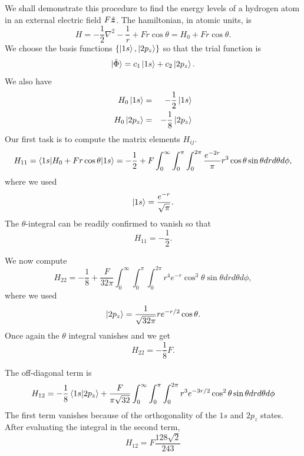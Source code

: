 We shall demonstrate this procedure to find the energy levels of a hydrogen
atom in an external electric field $F\hat{\bm{z}}$. The hamiltonian, in atomic units,
is
\begin{equation}\label{c1e21}
H = -\frac{1}{2}\nabla^2 - \frac{1}{r} + Fr\cos\theta = H_0 +
Fr\cos\theta.
\end{equation}
We choose the basis functions $\{\ket{1s}, \ket{2p_z}\}$ so that the trial
function is
\begin{equation}\label{c1e22}
\ket{\tilde{\Phi}} = c_1\ket{1s} + c_2\ket{2p_z}.
\end{equation}
We also have
\begin{eqnarray*}
H_0\ket{1s} &=& -\frac{1}{2}\ket{1s} \\
H_0\ket{2p_z} &=& -\frac{1}{8}\ket{2p_z}
\end{eqnarray*}
Our first task is to compute the matrix elements $H_{ij}$.
\begin{equation}\label{c1e23}
H_{11} = \braket{1s|H_0 + Fr\cos\theta|1s} = -\frac{1}{2} + F\int_0^\infty
\int_0^\pi\int_0^{2\pi} \frac{e^{-2r}}{\pi}r^3\cos\theta\sin\theta drd\theta
d\phi,
\end{equation}
where we used
\[
\ket{1s} = \frac{e^{-r}}{\sqrt{\pi}}.
\]
The $\theta$-integral can be readily confirmed to vanish so that
\begin{equation}\label{c1e24}
H_{11} = -\frac{1}{2}.
\end{equation}

We now compute
\begin{equation}\label{c1e25}
H_{22} = -\frac{1}{8} + \frac{F}{32\pi}\int_0^\infty\int_0^\pi\int_0^{2\pi}
r^4e^{-r}\cos^3\theta\sin\theta drd\theta d\phi,
\end{equation}
where we used
\begin{equation*}
\ket{2p_z} = \frac{1}{\sqrt{32\pi}} re^{-r/2}\cos\theta.
\end{equation*}
Once again the $\theta$ integral vanishes and we get
\begin{equation}\label{c1e26}
H_{22} = -\frac{1}{8}F.
\end{equation}

The off-diagonal term is
\begin{equation}\label{c1e27}
H_{12} = -\frac{1}{8}\braket{1s|2p_z} + \frac{F}{\pi\sqrt{32}}\int_0^\infty
\int_0^\pi\int_0^{2\pi} r^3 e^{-3r/2}\cos^2\theta\sin\theta drd\theta d\phi
\end{equation}
The first term vanishes because of the orthogonality of the $1s$ and $2p_z$ 
states. After evaluating the integral in the second term,
\begin{equation}\label{c1e28}
H_{12} = F\frac{128\sqrt{2}}{243}
\end{equation}

